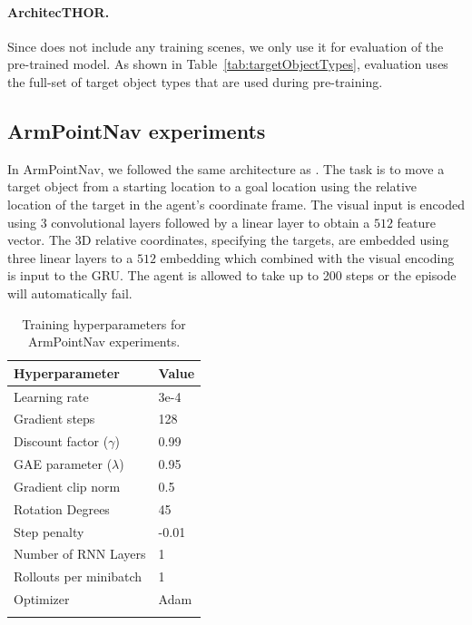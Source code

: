\paragraph{ArchitecTHOR.} Since \elienv{} does not include any training scenes, we only use it for evaluation of the \env{} pre-trained model. As shown in Table~\ref{tab:targetObjectTypes}, \elienv{} evaluation uses the full-set of target object types that are used during \env{} pre-training.

\subsection{ArmPointNav experiments}

In ArmPointNav, we followed the same architecture as \cite{manipulathor}. The task is to move a target object from a starting location to a goal location using the relative location of the target in the agent's coordinate frame. The visual input is encoded using 3 convolutional layers followed by a linear layer to obtain a $512$ feature vector. The 3D relative coordinates, specifying the targets, are embedded using three linear layers to a $512$ embedding which combined with the visual encoding is input to the GRU. The agent is allowed to take up to 200 steps or the episode will automatically fail. 

\begin{table}[htbp]
    \centering
    \begin{tabular}{ l l }
        \toprule
        \textbf{Hyperparameter}\qquad\qquad\qquad & \textbf{Value}\\
        \midrule
        Learning rate & 3e-4\\
        Gradient steps & 128\\
        Discount factor ($\gamma$) & 0.99 \\
        GAE parameter ($\lambda$) & 0.95 \\
        Gradient clip norm & 0.5 \\
        Rotation Degrees & 45\\
        Step penalty & -0.01\\
        Number of RNN Layers & 1\\
        Rollouts per minibatch & 1\\
        Optimizer & Adam \cite{kingma2014adam} \\
        \toprule\\[-0.05in]
    \end{tabular}
    \caption{Training hyperparameters for ArmPointNav experiments.}
    \label{tab:apnHp}
\end{table}

